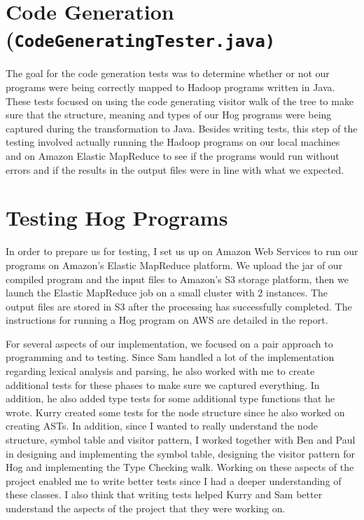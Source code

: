 \documentclass{report}
\begin{document}
\section{Code Generation (\tt CodeGeneratingTester.java\rm)}

The goal for the code generation tests was to determine whether or not our programs were being correctly mapped to Hadoop programs written in Java. These tests focused on using the code generating visitor walk of the tree to make sure that the structure, meaning and types of our Hog programs were being captured during the transformation to Java. Besides writing tests, this step of the testing involved actually running the Hadoop programs on our local machines and on Amazon Elastic MapReduce to see if the programs would run without errors and if the results in the output files were in line with what we expected.

\section{Testing Hog Programs}

In order to prepare us for testing, I set us up on Amazon Web Services to run our programs on Amazon’s Elastic MapReduce platform. We upload the jar of our compiled program and the input files to Amazon’s S3 storage platform, then we launch the Elastic MapReduce job on a small cluster with 2 instances. The output files are stored in S3 after the processing has successfully completed. The instructions for running a Hog program on AWS are detailed in the report.

For several aspects of our implementation, we focused on a pair approach to programming and to testing. Since Sam handled a lot of the implementation regarding lexical analysis and parsing, he also worked with me to create additional tests for these phases to make sure we captured everything. In addition, he also added type tests for some additional type functions that he wrote. Kurry created some tests for the node structure since he also worked on creating ASTs. In addition, since I wanted to really understand the node structure, symbol table and visitor pattern, I worked together with Ben and Paul in designing and implementing the symbol table, designing the visitor pattern for Hog and implementing the Type Checking walk. Working on these aspects of the project enabled me to write better tests since I had a deeper understanding of these classes. I also think that writing tests helped Kurry and Sam better understand the aspects of the project that they were working on. 
\end{document}
